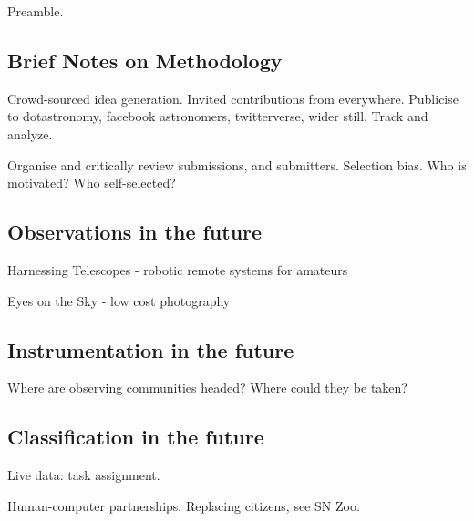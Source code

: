 \documentclass{ar2e}
\begin{document}
Preamble.


\subsection{Brief Notes on Methodology}
\label{sec:future:method}

Crowd-sourced idea generation.  Invited contributions from everywhere. 
Publicise to dotastronomy, facebook astronomers, twitterverse, wider still.
Track and analyze.

Organise and critically review submissions, and submitters. Selection bias.
Who is motivated? Who self-selected? 


\subsection{Observations in the future}
\label{sec:future:obs}

Harnessing Telescopes - robotic remote systems for amateurs

Eyes on the Sky - low cost photography


\subsection{Instrumentation in the future}
\label{sec:future:instr}

Where are observing communities headed? Where could they be taken?


\subsection{Classification in the future}
\label{sec:future:class}

Live data: task assignment. 

Human-computer partnerships. Replacing citizens, see SN Zoo.


\end{document}
